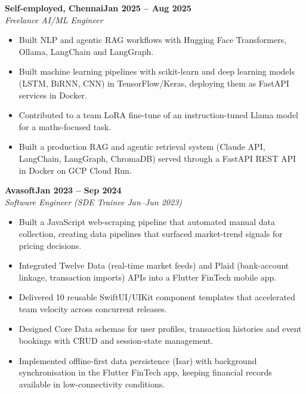 \documentclass[a4paper,11pt]{article}
\newcommand{\entry}[4]{\needspace{4\baselineskip}\noindent\textbf{#1}\hfill\textbf{#2}\\ \textit{#3}\hfill\textit{#4}\par}
\begin{document}
\vspace{4pt}
\entry{Self-employed, Chennai}{Jan 2025 – Aug 2025}{Freelance AI/ML Engineer}{}
\begin{itemize}
  \item Built NLP and agentic RAG workflows with Hugging Face Transformers, Ollama, LangChain and LangGraph.
  \item Built machine learning pipelines with scikit-learn and deep learning models (LSTM, BiRNN, CNN) in TensorFlow/Keras, deploying them as FastAPI services in Docker.
  \item Contributed to a team LoRA fine-tune of an instruction-tuned Llama model for a maths-focused task.
  \item Built a production RAG and agentic retrieval system (Claude API, LangChain, LangGraph, ChromaDB) served through a FastAPI REST API in Docker on GCP Cloud Run.
\end{itemize}
\vspace{4pt}
\entry{Avasoft}{Jan 2023 – Sep 2024}{Software Engineer (SDE Trainee Jan–Jun 2023)}{}
\begin{itemize}
  \item Built a JavaScript web-scraping pipeline that automated manual data collection, creating data pipelines that surfaced market-trend signals for pricing decisions.
  \item Integrated Twelve Data (real-time market feeds) and Plaid (bank-account linkage, transaction imports) APIs into a Flutter FinTech mobile app.
  \item Delivered 10 reusable SwiftUI/UIKit component templates that accelerated team velocity across concurrent releases.
  \item Designed Core Data schemas for user profiles, transaction histories and event bookings with CRUD and session-state management.
  \item Implemented offline-first data persistence (Isar) with background synchronisation in the Flutter FinTech app, keeping financial records available in low-connectivity conditions.
\end{itemize}

\end{document}
